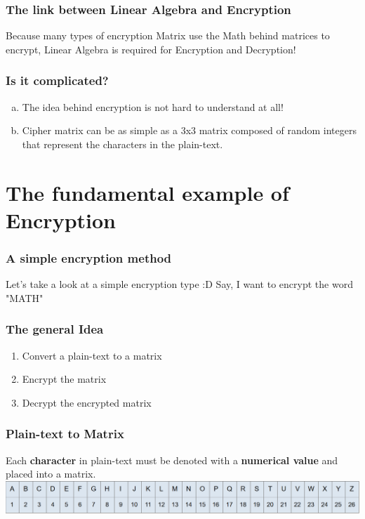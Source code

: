 \documentclass[11pt]{beamer}
\begin{document}
\begin{frame}\frametitle{The link between Linear Algebra and Encryption}

Because many types of encryption Matrix use the Math behind matrices to encrypt, Linear Algebra is required for Encryption and Decryption!

\end{frame}

\begin{frame}\frametitle{Is it complicated?}
\begin{enumerate}[a.]
	\item The idea behind encryption is not hard to understand at all! 
	\item Cipher matrix can be as simple as a 3x3 matrix composed of random 	integers that represent the characters in the plain-text.
\end{enumerate}

\end{frame}

\section{The fundamental example of Encryption}
\begin{frame}\frametitle{A simple encryption method}
\center Let's take a look at a simple encryption type :D
\center Say, I want to encrypt the word "MATH"
\end{frame}

\begin{frame}\frametitle{The general Idea}
\begin{enumerate}[1]
	\item Convert a plain-text to a matrix
	\item Encrypt the matrix
	\item Decrypt the encrypted matrix
\end{enumerate}
\end{frame}

\begin{frame}\frametitle{Plain-text to Matrix}

Each \textbf{character} in plain-text must be denoted with a \textbf{numerical value} and placed into a matrix.
\center \includegraphics[scale=0.275]{numerical.png}
\end{frame}
\end{document}
